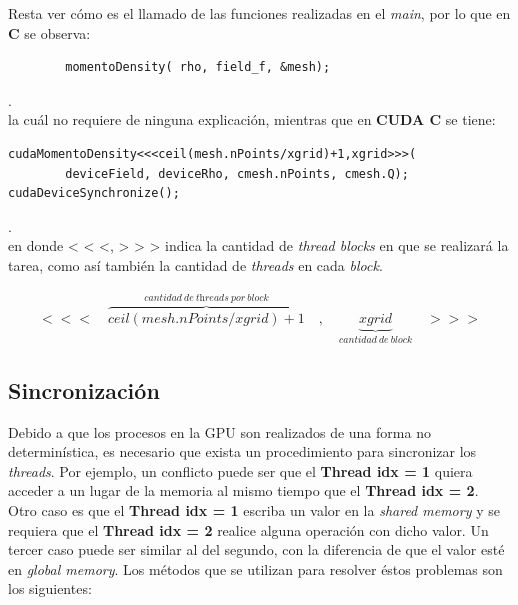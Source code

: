 Resta ver cómo es el llamado de las funciones realizadas en el \textit{main}, por lo que en \textbf{C} se observa:


{\footnotesize
	\begin{frame}{}
		\begin{lstlisting}
		momentoDensity( rho, field_f, &mesh);
		\end{lstlisting}
		
	\end{frame}
}.
\\
la cuál no requiere de ninguna explicación, mientras que en \textbf{CUDA C} se tiene:

{\footnotesize
	\begin{frame}{}
		\begin{lstlisting}
cudaMomentoDensity<<<ceil(mesh.nPoints/xgrid)+1,xgrid>>>(
 		deviceField, deviceRho, cmesh.nPoints, cmesh.Q);  
cudaDeviceSynchronize();

		\end{lstlisting}
		
	\end{frame}
}.
\\
en donde < < <, > > > indica la cantidad de \textit{thread blocks} en que se realizará la tarea, como así también la cantidad de \textit{threads} en cada \textit{block}.

\begin{align*}
		<<<\quad \overbrace{ceil(mesh.nPoints/xgrid)+1}^{cantidad \>de\> \textit{threads}\> por\> \textit{block}}\quad,\quad \underbrace{xgrid}_{cantidad\>de\>block} \quad>>>
\end{align*}

\subsection{Sincronización}

Debido a que los procesos en la GPU son realizados de una forma no determinística, es necesario que exista un procedimiento para sincronizar los \textit{threads}. Por ejemplo, un conflicto puede ser que el \textbf{Thread idx = 1} quiera acceder a un lugar de la memoria al mismo tiempo que el \textbf{Thread idx = 2}. Otro caso es que el \textbf{Thread idx = 1} escriba un valor en la \textit{shared memory} y se requiera que el \textbf{Thread idx = 2} realice alguna operación con dicho valor. Un tercer caso puede ser similar al del segundo, con la diferencia de que el valor esté en \textit{global memory}. Los métodos que se utilizan para resolver éstos problemas son los siguientes:

